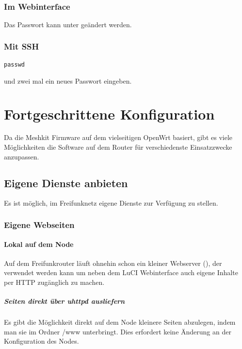 \documentclass[a4paper,12pt,ngerman]{sphinxmanual}
\begin{document}
\subsection{Im Webinterface}
\label{usage/change-password:im-webinterface}
Das Passwort kann unter  geändert
werden.


\subsection{Mit SSH}
\label{usage/change-password:mit-ssh}
\begin{Verbatim}[commandchars=\\\{\}]
passwd
\end{Verbatim}

und zwei mal ein neues Passwort eingeben.


\chapter{Fortgeschrittene Konfiguration}
\label{advanced::doc}\label{advanced:fortgeschrittene-konfiguration}
Da die Meshkit Firmware auf dem vielseitigen OpenWrt basiert, gibt es viele
Möglichkeiten die Software auf dem Router für verschiedenste Einsatzzwecke
anzupassen.


\section{Eigene Dienste anbieten}
\label{advanced/offer-services::doc}\label{advanced/offer-services:eigene-dienste-anbieten}
Es ist möglich, im Freifunknetz eigene Dienste zur Verfügung zu stellen.


\subsection{Eigene Webseiten}
\label{advanced/websites:eigene-webseiten}\label{advanced/websites::doc}

\subsubsection{Lokal auf dem Node}
\label{advanced/websites:lokal-auf-dem-node}
Auf dem Freifunkrouter läuft ohnehin schon ein kleiner Webserver (),
der verwendet werden kann um neben dem LuCI Webinterface auch eigene Inhalte per
HTTP zugänglich zu machen.


\paragraph{Seiten direkt über uhttpd ausliefern}
\label{advanced/websites:seiten-direkt-uber-uhttpd-ausliefern}
Es gibt die Möglichkeit direkt auf dem Node kleinere Seiten abzulegen, indem man
sie im Ordner /www unterbringt. Dies erfordert keine Änderung an der
Konfiguration des Nodes.
\end{document}
